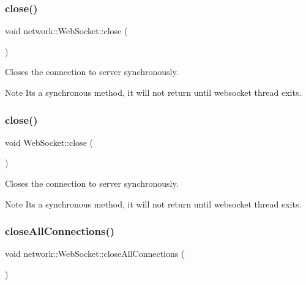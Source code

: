 \subsubsection{\texorpdfstring{close()}{close()}\hspace{0.1cm}{\footnotesize\ttfamily [1/2]}}
{\footnotesize\ttfamily void network\+::\+Web\+Socket\+::close (\begin{DoxyParamCaption}{ }\end{DoxyParamCaption})}



Closes the connection to server synchronously. 

\begin{DoxyNote}{Note}
It\textquotesingle{}s a synchronous method, it will not return until websocket thread exits. 
\end{DoxyNote}
\mbox{\label{classnetwork_1_1WebSocket_abef10acf60b4d5b87399e6f9c5ad808d}} 
\subsubsection{\texorpdfstring{close()}{close()}\hspace{0.1cm}{\footnotesize\ttfamily [2/2]}}
{\footnotesize\ttfamily void Web\+Socket\+::close (\begin{DoxyParamCaption}{ }\end{DoxyParamCaption})}



Closes the connection to server synchronously. 

\begin{DoxyNote}{Note}
It\textquotesingle{}s a synchronous method, it will not return until websocket thread exits. 
\end{DoxyNote}
\mbox{\label{classnetwork_1_1WebSocket_a361327851f089c1fa506cc1d7bc6359b}} 
\subsubsection{\texorpdfstring{close\+All\+Connections()}{closeAllConnections()}\hspace{0.1cm}{\footnotesize\ttfamily [1/2]}}
{\footnotesize\ttfamily void network\+::\+Web\+Socket\+::close\+All\+Connections (\begin{DoxyParamCaption}{ }\end{DoxyParamCaption})\hspace{0.3cm}{\ttfamily [static]}}

